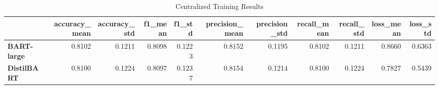 
\begin{table*}[t]
\centering
\caption{Centralized Training Results}\label{tab:centralized_results}
\begin{table}
\centering
\caption{Centralized Training Results}
\label{tab:centralized_results}
\begin{tabular}{lrrrrrrrrrr}
\toprule
{} &  accuracy\_mean &  accuracy\_std &  f1\_mean &  f1\_std &  precision\_mean &  precision\_std &  recall\_mean &  recall\_std &  loss\_mean &  loss\_std \\
\midrule
\textbf{BART-large} &         0.8102 &        0.1211 &   0.8098 &  0.1223 &          0.8152 &         0.1195 &       0.8102 &      0.1211 &     0.8660 &    0.6363 \\
\textbf{DistilBART} &         0.8100 &        0.1224 &   0.8097 &  0.1237 &          0.8154 &         0.1214 &       0.8100 &      0.1224 &     0.7827 &    0.5439 \\
\bottomrule
\end{tabular}
\end{table}

\end{table*}